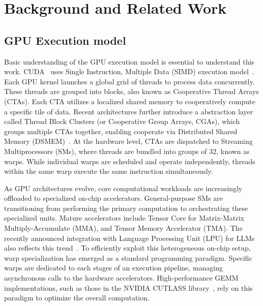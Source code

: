 \section{Background and Related Work} %

\subsection{GPU Execution model}

Basic understanding of the GPU execution model is essential to understand this work. CUDA~\cite{cuda} uses Single Instruction, Multiple Data (SIMD) execution model~\cite{lindholm2008nvidia}. Each GPU kernel launches a global grid of threads to process data concurrently. These threads are grouped into blocks, also known as Cooperative Thread Arrays (CTAs). Each CTA utilizes a localized shared memory to cooperatively compute a specific tile of data. Recent architectures further introduce a abstraction layer called Thread Block Clusters (or Cooperative Group Arrays, CGAs), which groups multiple CTAs together, enabling cooperate via Distributed Shared Memory (DSMEM)~\cite{nvidia2022hopper}. At the hardware level, CTAs are dispatched to Streaming Multiprocessors (SMs), where threads are bundled into groups of 32, known as warps. While individual warps are scheduled and operate independently, threads within the same warp execute the same instruction simultaneously.

As GPU architectures evolve, core computational workloads are increasingly offloaded to specialized on-chip accelerators. General-purpose SMs are transitioning from performing the primary computation to orchestrating these specialized units. Mature accelerators include Tensor Core for Matrix-Matrix Multiply-Accumulate (MMA), and Tensor Memory Accelerator (TMA). The recently announced integration with Language Processing Unit (LPU) for LLMs also reflects this trend~\cite{LPU}. To efficiently exploit this heterogeneous on-chip setup, warp specialization has emerged as a standard programming paradigm. Specific warps are dedicated to each stages of an execution pipeline, managing asynchronous calls to the hardware accelerators. High-performance GEMM implementations, such as those in the NVIDIA CUTLASS library~\cite{cutlass}, rely on this paradigm to optimize the overall computation.


